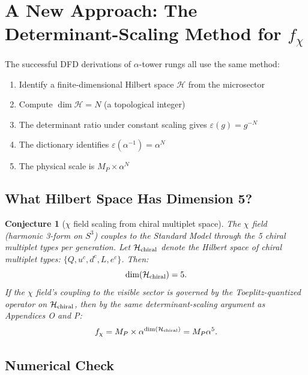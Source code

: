 \documentclass[11pt]{article}
\newtheorem{conjecture}[theorem]{Conjecture}
\theoremstyle{definition}
\theoremstyle{remark}
\begin{document}
\section{A New Approach: The Determinant-Scaling Method for $f_\chi$}
\label{sec:determinant}

The successful DFD derivations of $\alpha$-tower rungs all use the same method:
\begin{enumerate}
\item Identify a finite-dimensional Hilbert space $\mathcal{H}$ from the microsector
\item Compute $\dim \mathcal{H} = N$ (a topological integer)
\item The determinant ratio under constant scaling gives $\varepsilon(g) = g^{-N}$
\item The dictionary identifies $\varepsilon(\alpha^{-1}) = \alpha^N$
\item The physical scale is $M_P \times \alpha^N$
\end{enumerate}

\subsection{What Hilbert Space Has Dimension 5?}

\begin{conjecture}[$\chi$ field scaling from chiral multiplet space]
\label{conj:chi-5}
The $\chi$ field (harmonic 3-form on $S^3$) couples to the Standard Model
through the 5 chiral multiplet types per generation. Let
$\mathcal{H}_{\rm chiral}$ denote the Hilbert space of chiral multiplet
types: $\{Q, u^c, d^c, L, e^c\}$. Then:
\begin{equation}
\dim(\mathcal{H}_{\rm chiral}) = 5.
\end{equation}
If the $\chi$ field's coupling to the visible sector is governed by
the Toeplitz-quantized operator on $\mathcal{H}_{\rm chiral}$, then by
the same determinant-scaling argument as Appendices O and P:
\begin{equation}
f_\chi = M_P \times \alpha^{\dim(\mathcal{H}_{\rm chiral})} = M_P \alpha^5.
\end{equation}
\end{conjecture}

\subsection{Numerical Check}
\end{document}
